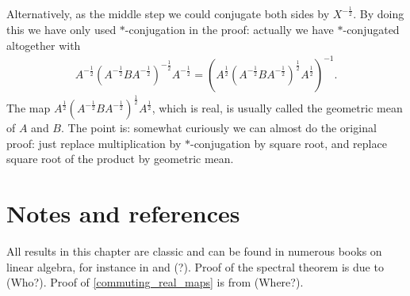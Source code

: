 \begin{huom}
Alternatively, as the middle step we could conjugate both sides by $X^{-\frac{1}{2}}$. By doing this we have only used $*$-conjugation in the proof: actually we have $*$-conjugated altogether with 
\begin{align*}
	A^{-\frac{1}{2}} (A^{-\frac{1}{2}}B A^{-\frac{1}{2}})^{-\frac{1}{2}} A^{-\frac{1}{2}} = (A^{\frac{1}{2}} (A^{-\frac{1}{2}}B A^{-\frac{1}{2}})^{\frac{1}{2}} A^{\frac{1}{2}})^{-1}.
\end{align*}
The map $A^{\frac{1}{2}} (A^{-\frac{1}{2}}B A^{-\frac{1}{2}})^{\frac{1}{2}} A^{\frac{1}{2}}$, which is real, is usually called the geometric mean of $A$ and $B$. The point is: somewhat curiously we can almost do the original proof: just replace multiplication by $*$-conjugation by square root, and replace square root of the product by geometric mean.
\end{huom}

\section{Notes and references}

All results in this chapter are classic and can be found in numerous books on linear algebra, for instance in \cite{Bhatia} and \cite{Bhatia2} (?). Proof of the spectral theorem is due to (Who?). Proof of \ref{commuting_real_maps} is from (Where?).

